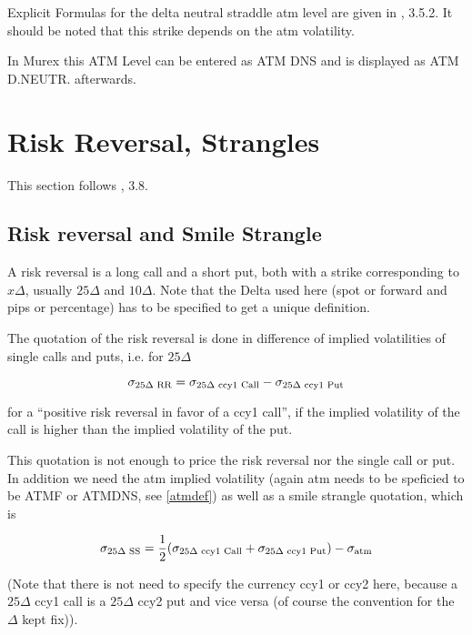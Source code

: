 \documentclass{amsart}
\theoremstyle{plain}
\numberwithin{equation}{section}
\begin{document}
Explicit Formulas for the delta neutral straddle atm level are given in \cite{Clark}, 3.5.2. It
should be noted that this strike depends on the atm volatility.

In Murex this ATM Level can be entered as ATM DNS and is displayed as ATM D.NEUTR. afterwards.


\section{Risk Reversal, Strangles}

This section follows \cite{Clark}, 3.8.

\subsection{Risk reversal and Smile Strangle}

A risk reversal is a long call and a short put, both with a strike corresponding to $x\Delta$,
usually $25\Delta$ and $10\Delta$. Note that the Delta used here (spot or forward and pips or
percentage) has to be specified to get a unique definition.

The quotation of the risk reversal is done in difference of implied volatilities of single
calls and puts, i.e. for $25\Delta$

\begin{equation}\label{eqRR}
\sigma_{25\Delta\textnormal{ RR}} = \sigma_{25\Delta\textnormal{ ccy1 Call}} - \sigma_{25\Delta\textnormal{ ccy1 Put}}
\end{equation}

for a ``positive risk reversal in favor of a ccy1 call'', if the implied volatility of the call
is higher than the implied volatility of the put.

This quotation is not enough to price the risk reversal nor the single call or put. In addition
we need the atm implied volatility (again atm needs to be speficied to be ATMF or ATMDNS, see
\ref{atmdef}) as well as a smile strangle quotation, which is

\begin{equation}\label{eqSS}
\sigma_{25\Delta\textnormal{ SS}} = \frac{1}{2} ( \sigma_{25\Delta\textnormal{ ccy1 Call}} + \sigma_{25\Delta\textnormal{ ccy1 Put}} ) - \sigma_{\textnormal{atm}}
\end{equation}

(Note that there is not need to specify the currency ccy1 or ccy2 here, because a $25\Delta$ ccy1 call
is a $25\Delta$ ccy2 put and vice versa (of course the convention for the $\Delta$ kept fix)).
\end{document}
